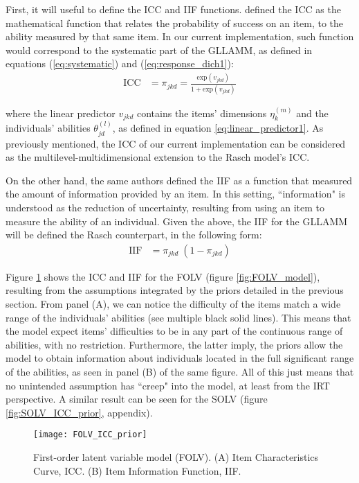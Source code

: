 First, it will useful to define the ICC and IIF functions. \citet{Hambleton_et_al_1991b} defined the ICC as the mathematical function that relates the probability of success on an item, to the ability measured by that same item. In our current implementation, such function would correspond to the systematic part of the GLLAMM, as defined in equations (\ref{eq:systematic}) and (\ref{eq:response_dich1}):
%
\begin{equation} \label{eq:ICC}
	\begin{split}
		\text{ICC} &= \pi_{jkd} = \frac{ \text{exp}(v_{jkd}) }{ 1 + \text{exp}(v_{jkd}) }
	\end{split}	
\end{equation}

\noindent where the linear predictor $v_{jkd}$ contains the items' dimensions $\eta^{(m)}_{k}$ and the individuals' abilities $\theta^{(l)}_{jd}$, as defined in equation \ref{eq:linear_predictor1}. As previously mentioned, the ICC of our current implementation can be considered as the multilevel-multidimensional extension to the Rasch model's ICC.

On the other hand, the same authors defined the IIF as a function that measured the amount of information provided by an item. In this setting, ``information" is understood as the reduction of uncertainty, resulting from using an item to measure the ability of an individual. Given the above, the IIF for the GLLAMM will be defined the Rasch counterpart, in the following form:
%
\begin{equation} \label{eq:IIF}
	\begin{split}
		\text{IIF} &= \pi_{jkd} \; (1 - \pi_{jkd})
	\end{split}	
\end{equation}

Figure \ref{fig:FOLV_ICC_prior} shows the ICC and IIF for the FOLV (figure \ref{fig:FOLV_model}), resulting from the assumptions integrated by the priors detailed in the previous section. From panel (A), we can notice the difficulty of the items match a wide range of the individuals' abilities (see multiple black solid lines). This means that the model expect items' difficulties to be in any part of the continuous range of abilities, with no restriction. Furthermore, the latter imply, the priors allow the model to obtain information about individuals located in the full significant range of the abilities, as seen in panel (B) of the same figure. All of this just means that no unintended assumption has ``creep" into the model, at least from the IRT perspective. A similar result can be seen for the SOLV (figure \ref{fig:SOLV_ICC_prior}, appendix).
%
\begin{figure}[H]
	\centering
	\texttt{[image: FOLV\_ICC\_prior]}
	\caption[First-order latent variable model (FOLV). Item Characteristic Curve (ICC) and Item Information Function (IIF).]%
	{First-order latent variable model (FOLV). (A) Item Characteristics Curve, ICC. (B) Item Information Function, IIF.}
	\label{fig:FOLV_ICC_prior}
\end{figure}

